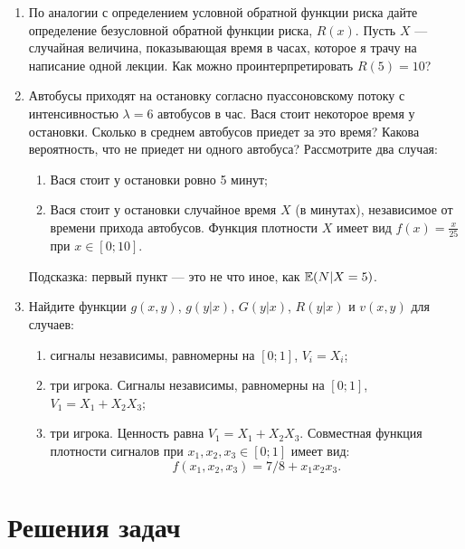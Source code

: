 \begin{enumerate}
\item По аналогии с определением условной обратной функции риска дайте определение безусловной обратной функции риска, $ R(x) $. Пусть $ X $ — случайная величина, показывающая время в часах, которое я трачу на написание одной лекции. Как можно проинтерпретировать $ R(5)=10 $?
\item Автобусы приходят на остановку согласно пуассоновскому потоку с интенсивностью $ \lambda=6 $ автобусов в час. Вася стоит некоторое время у остановки. Сколько в среднем автобусов приедет за это время? Какова вероятность, что не приедет ни одного автобуса? Рассмотрите два случая:
\begin{enumerate}
\item Вася стоит у остановки ровно 5 минут;
\item Вася стоит у остановки случайное время $ X $ (в минутах), независимое от времени прихода автобусов. Функция плотности $ X $ имеет вид $ f(x)= \frac{x}{25}$ при $ x\in [0;10] $.
\end{enumerate}
Подсказка: первый пункт — это не что иное, как $ \operatorname{\mathbb{E}}(N|X=5) $.
\item Найдите функции $ g(x,y)$, $ g(y|x)$, $ G(y|x)$,  $R(y|x)$ и $v(x,y)$ для случаев:
\label{ex_vxy}
\begin{enumerate}
\item сигналы независимы, равномерны на $ [0;1] $, $ V_{i}=X_{i} $;
\item три игрока. Сигналы независимы, равномерны на $ [0;1] $, $ V_{1}=X_{1}+X_{2}X_{3} $;
\item три игрока. Ценность равна $ V_{1}=X_{1}+X_{2}X_{3} $. Совместная функция плотности сигналов при $ x_{1},x_{2},x_{3}\in[0;1]$ имеет вид:
\[
f(x_{1},x_{2},x_{3})=7/8+x_{1}x_{2}x_{3}.
\]
\end{enumerate}
\end{enumerate}


\section{Решения задач}

